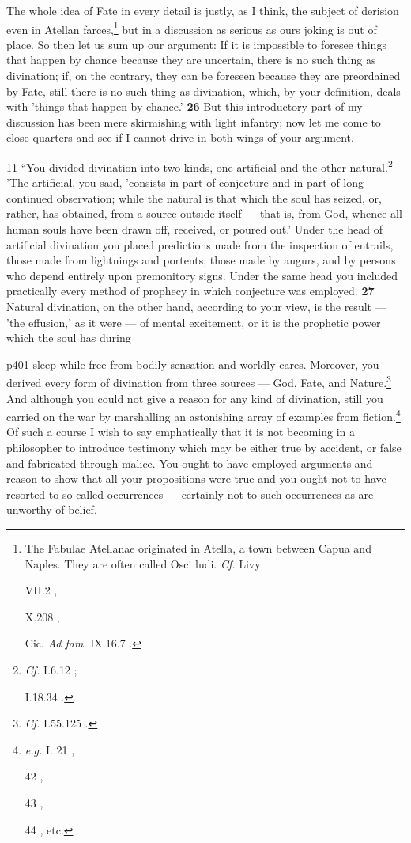 The whole idea of Fate in every detail is justly, as I think, the subject of derision even in Atellan farces,\texthebrew{}\footnote{The Fabulae Atellanae originated in Atella, a town between Capua and Naples. They are often called Osci ludi. \emph{Cf.} Livy

VII.2 ,

X.208 ;

Cic. \emph{Ad fam.} IX.16.7 .

} but in a discussion as serious as ours joking is out of place. So then let us sum up our argument: If it is impossible to foresee things that happen by chance because they are uncertain, there is no such thing as divination; if, on the contrary, they can be foreseen because they are preordained by Fate, still there is no such thing as divination, which, by your definition, deals with 'things that happen by chance.' \textbf{26} But this introductory part of my discussion has been mere skirmishing with light infantry; now let me come to close quarters and see if I cannot drive in both wings of your argument.

11
``You divided divination into two kinds, one artificial and the other natural.\texthebrew{}\footnote{\emph{Cf.}
I.6.12 ;

I.18.34 .

} 'The artificial, you said, 'consists in part of conjecture and in part of long-continued observation; while the natural is that which the soul has seized, or, rather, has obtained, from a source outside itself \texthebrew{—} that is, from God, whence all human souls have been drawn off, received, or poured out.' Under the head of artificial divination you placed predictions made from the inspection of entrails, those made from lightnings and portents, those made by augurs, and by persons who depend entirely upon premonitory signs. Under the same head you included practically every method of prophecy in which conjecture was employed. \textbf{27} Natural divination, on the other hand, according to your view, is the result \texthebrew{—} 'the effusion,' as it were \texthebrew{—} of mental excitement, or it is the prophetic power which the soul has during

p401 sleep while free from bodily sensation and worldly cares. Moreover, you derived every form of divination from three sources \texthebrew{—} God, Fate, and Nature.\texthebrew{}\footnote{\emph{Cf.}
I.55.125 .

} And although you could not give a reason for any kind of divination, still you carried on the war by marshalling an astonishing array of examples from fiction.\texthebrew{}\footnote{\emph{e.g.} I. 21 ,

42 ,

43 ,

44 , etc.

} Of such a course I wish to say emphatically that it is not becoming in a philosopher to introduce testimony which may be either true by accident, or false and fabricated through malice. You ought to have employed arguments and reason to show that all your propositions were true and you ought not to have resorted to so\texthebrew{‑}called occurrences \texthebrew{—} certainly not to such occurrences as are unworthy of belief.

